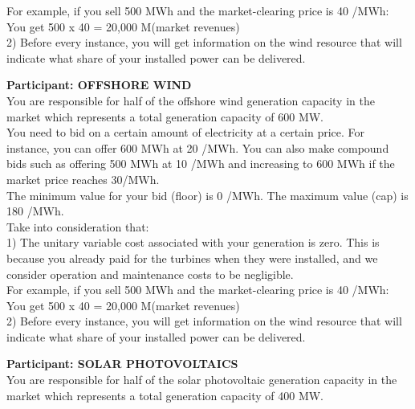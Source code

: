 \documentclass[3p]{elsarticle} %
\begin{document}
For example, if you sell 500 MWh and the market-clearing price is 40 \EUR/MWh: \\

You get 500 x 40 = 20,000 M\EUR (market revenues) \\

2)	Before every instance, you will get information on the wind resource that will indicate what share of your installed power can be delivered. 

\newpage

\textbf{Participant: OFFSHORE WIND} \\

You are responsible for half of the offshore wind generation capacity in the market which represents a total generation capacity of 600 MW. \\

You need to bid on a certain amount of electricity at a certain price. For instance, you can offer 600 MWh at 20 \EUR/MWh. You can also make compound bids such as offering 500 MWh at 10 \EUR/MWh and increasing to 600 MWh if the market price reaches 30\EUR/MWh. \\

The minimum value for your bid (floor) is 0 \EUR/MWh. The maximum value (cap) is 180 \EUR/MWh. \\

Take into consideration that: \\

1)	The unitary variable cost associated with your generation is zero. This is because you already paid for the turbines when they were installed, and we consider operation and maintenance costs to be negligible. \\

For example, if you sell 500 MWh and the market-clearing price is 40 \EUR/MWh:\\

You get 500 x 40 = 20,000 M\EUR (market revenues) \\

2)	Before every instance, you will get information on the wind resource that will indicate what share of your installed power can be delivered. \\

\newpage

\textbf{Participant: SOLAR PHOTOVOLTAICS} \\

You are responsible for half of the solar photovoltaic generation capacity in the market which represents a total generation capacity of 400 MW. \\
\end{document}
